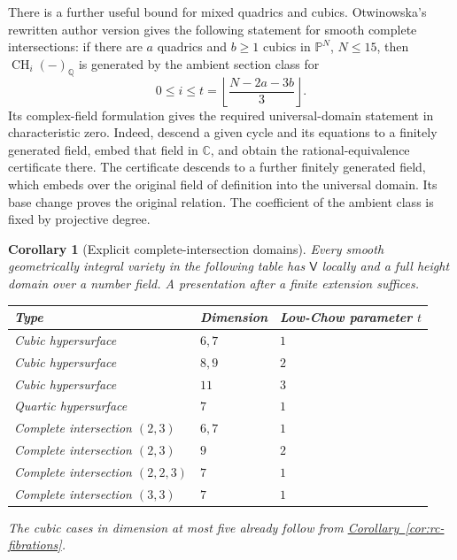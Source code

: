 \documentclass[11pt,a4paper]{article}
\newtheorem{corollary}[theorem]{Corollary}
\theoremstyle{definition}
\theoremstyle{remark}\newtheorem{remark}[theorem]{Remark}
\numberwithin{equation}{section}
\newcommand{\Q}{\mathbb Q}\newcommand{\R}{\mathbb R}\newcommand{\C}{\mathbb C}
\newcommand{\PP}{\mathbb P}\newcommand{\LL}{\mathbb L}
\newcommand{\CH}{\operatorname{CH}}\newcommand{\an}{\mathrm{an}}
\newcommand{\corref}[1]{\hyperref[#1]{\textcolor{resultlink}{Corollary~\ref*{#1}}}}
\begin{document}
There is a further useful bound for mixed quadrics and cubics.
Otwinowska's rewritten author version \cite[Corollaire 1]{Otwinowska}
gives the following statement for smooth complete intersections:
if there are $a$ quadrics and $b\geq1$ cubics in $\PP^N$, $N\leq15$,
then $\CH_i(-)_\Q$ is generated by the ambient section class for
\begin{equation}\label{eq:ot-bound}
 0\leq i\leq t=\left\lfloor\frac{N-2a-3b}{3}\right\rfloor.
\end{equation}
Its complex-field formulation gives the required universal-domain
statement in characteristic zero. Indeed, descend a given cycle
and its equations to a finitely generated field, embed that field
in $\C$, and obtain the rational-equivalence certificate there.
The certificate descends to a further finitely generated field,
which embeds over the original field of definition into the
universal domain. Its base change proves the original relation.
The coefficient of the ambient class is fixed by projective degree.

\begin{corollary}[Explicit complete-intersection domains]\label{cor:ci-list}
Every smooth geometrically integral variety in the following table
has $\mathsf V$ locally and a full height domain over a number
field. A presentation after a finite extension suffices.
\begin{center}
\begin{tabular}{lll}
\toprule
Type & Dimension & Low-Chow parameter $t$\\
\midrule
Cubic hypersurface & $6,7$ & $1$\\
Cubic hypersurface & $8,9$ & $2$\\
Cubic hypersurface & $11$ & $3$\\
Quartic hypersurface & $7$ & $1$\\
Complete intersection $(2,3)$ & $6,7$ & $1$\\
Complete intersection $(2,3)$ & $9$ & $2$\\
Complete intersection $(2,2,3)$ & $7$ & $1$\\
Complete intersection $(3,3)$ & $7$ & $1$\\
\bottomrule
\end{tabular}
\end{center}
The cubic cases in dimension at most five already follow from
\corref{cor:rc-fibrations}.
\end{corollary}
\end{document}
